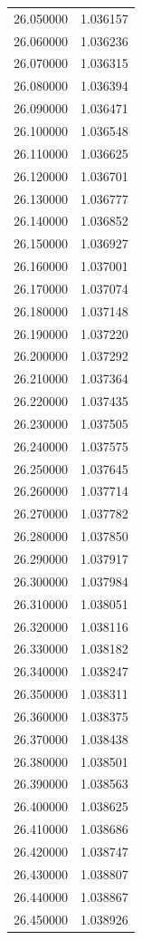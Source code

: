 \begin{tabular}{rr}
26.050000 & 1.036157 \\
26.060000 & 1.036236 \\
26.070000 & 1.036315 \\
26.080000 & 1.036394 \\
26.090000 & 1.036471 \\
26.100000 & 1.036548 \\
26.110000 & 1.036625 \\
26.120000 & 1.036701 \\
26.130000 & 1.036777 \\
26.140000 & 1.036852 \\
26.150000 & 1.036927 \\
26.160000 & 1.037001 \\
26.170000 & 1.037074 \\
26.180000 & 1.037148 \\
26.190000 & 1.037220 \\
26.200000 & 1.037292 \\
26.210000 & 1.037364 \\
26.220000 & 1.037435 \\
26.230000 & 1.037505 \\
26.240000 & 1.037575 \\
26.250000 & 1.037645 \\
26.260000 & 1.037714 \\
26.270000 & 1.037782 \\
26.280000 & 1.037850 \\
26.290000 & 1.037917 \\
26.300000 & 1.037984 \\
26.310000 & 1.038051 \\
26.320000 & 1.038116 \\
26.330000 & 1.038182 \\
26.340000 & 1.038247 \\
26.350000 & 1.038311 \\
26.360000 & 1.038375 \\
26.370000 & 1.038438 \\
26.380000 & 1.038501 \\
26.390000 & 1.038563 \\
26.400000 & 1.038625 \\
26.410000 & 1.038686 \\
26.420000 & 1.038747 \\
26.430000 & 1.038807 \\
26.440000 & 1.038867 \\
26.450000 & 1.038926 \\

\end{tabular}
